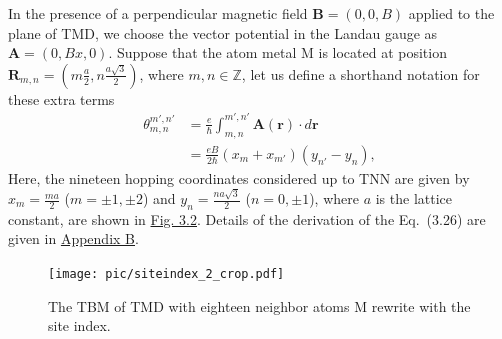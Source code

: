 In the presence of a perpendicular magnetic field $\mathbf{B} = (0,0,B)$ applied to the plane of \ac{TMD}, we choose the vector potential in the Landau gauge as $\mathbf{A} = (0, Bx, 0)$. Suppose that the atom metal M is located at position $\mathbf{R}_{m,n} = \left(m \frac{a}{2}, n \frac{a\sqrt{3}}{2}\right)$, where $m,n \in \mathbb{Z}$, let us define a shorthand notation for these extra terms
\begin{equation}
	\begin{aligned}
		\theta_{m,n}^{m',n'}
		& = \frac{e}{\hbar} \int_{m,n}^{m',n'} \mathbf{A}(\mathbf{r}) \cdot d\mathbf{r} \\
		& = \frac{eB}{2\hbar}(x_{m} + x_{m'})(y_{n'} - y_{n}),
	\end{aligned}
\end{equation}
Here, the nineteen hopping coordinates considered up to TNN are given by $x_{m} = \frac{ma}{2}$ ($m = \pm 1, \pm 2$) and $y_{n} = \frac{na\sqrt{3}}{2}$ ($n = 0, \pm 1$), where $a$ is the lattice constant, are shown in \hyperref[fig:site index]{Fig. 3.2}. Details of the derivation of the Eq.~(3.26) are given in \hyperref[appendix B]{Appendix B}.
\begin{figure}[H]
	\centering
	\texttt{[image: pic/siteindex\_2\_crop.pdf]}
	\caption[TMD with eighteen neighbors atom M rewrite with the site index.]{\label{fig:site index} The \ac{TBM} of \ac{TMD} with eighteen neighbor atoms M rewrite with the site index.}
\end{figure}


